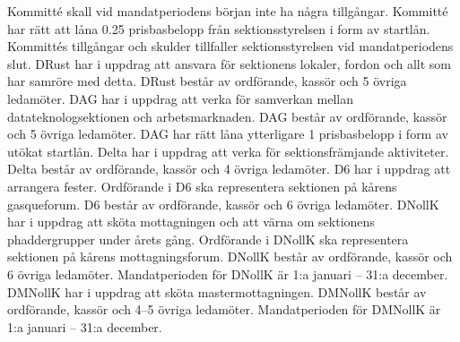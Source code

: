 \documentclass[a4paper]{dtek}
\newcommand{\prisbasbelopp}[1]{
    #1 prisbasbelopp
    \ifdef{\nuvarandeprisbasbelopp}{
        \marginpar{
            \small{ \textbf{\roundandprint{\xintiexpr#1 * \nuvarandeprisbasbelopp\relax}kr}}
        }
    }{}
}
\begin{document}
\para Kommitté skall vid mandatperiodens början inte ha några tillgångar.
\para Kommitté har rätt att låna \prisbasbelopp{0.25} från sektionsstyrelsen i form av startlån.
\para Kommittés tillgångar och skulder tillfaller sektionsstyrelsen vid mandatperiodens slut.
\para[DRust] DRust har i uppdrag att ansvara för sektionens lokaler, fordon och allt som har samröre med detta.
\para DRust består av ordförande, kassör och 5 övriga ledamöter.
\para[DAG] DAG har i uppdrag att verka för samverkan mellan datateknologsektionen och arbetsmarknaden.
\para DAG består av ordförande, kassör och 5 övriga ledamöter.
\para DAG har rätt låna ytterligare \prisbasbelopp{1} i form av utökat startlån.
\para[Delta] Delta har i uppdrag att verka för sektionsfrämjande aktiviteter.
\para Delta består av ordförande, kassör och 4 övriga ledamöter.
\para[D6] D6 har i uppdrag att arrangera fester.
\para Ordförande i D6 ska representera sektionen på kårens gasqueforum.
\para D6 består av ordförande, kassör och 6 övriga ledamöter.
\para[DNollK] DNollK har i uppdrag att sköta mottagningen och att värna om sektionens phaddergrupper under årets gång.
\para Ordförande i DNollK ska representera sektionen på kårens mottagningsforum.
\para DNollK består av ordförande, kassör och 6 övriga ledamöter.
\para Mandatperioden för DNollK är 1:a januari – 31:a december.
\para[DMNollK] DMNollK har i uppdrag att sköta mastermottagningen.
\para DMNollK består av ordförande, kassör och 4–5 övriga ledamöter.
\para Mandatperioden för DMNollK är 1:a januari – 31:a december.
\end{document}
